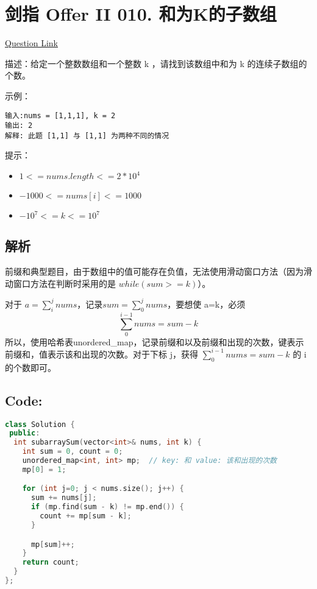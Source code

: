 ﻿\section{剑指 Offer II 010. 和为K的子数组}

\href{https://leetcode.cn/problems/QTMn0o/?envType=study-plan&id=lcof-ii&plan=lcof&plan_progress=yc5zsnt}{Question Link}

描述：给定一个整数数组和一个整数 k ，请找到该数组中和为 k 的连续子数组的个数。

示例：

\begin{lstlisting}
输入:nums = [1,1,1], k = 2
输出: 2
解释: 此题 [1,1] 与 [1,1] 为两种不同的情况
\end{lstlisting}

提示：

\begin{itemize}
  \item $1 <= nums.length <= 2 * 10^4$
  \item $-1000 <= nums[i] <= 1000$
  \item $-10^7 <= k <= 10^7$
\end{itemize}


\subsection{解析}

前缀和典型题目，由于数组中的值可能存在负值，无法使用滑动窗口方法（因为滑动窗口方法在判断时采用的是 $while(sum>=k)$）。

对于 $a=\sum_{i}^{j} nums$，记录$sum=\sum_{0}^{j}nums$，要想使 a=k，必须
 $$\sum_{0}^{i-1}nums=sum-k$$
所以，使用哈希表unordered\_map，记录前缀和以及前缀和出现的次数，键表示前缀和，值表示该和出现的次数。对于下标 j，获得 $\sum_{0}^{i-1}nums=sum-k$ 的 i 的个数即可。

\subsection*{Code:}

\begin{lstlisting}[language=C++]
class Solution {
 public:
  int subarraySum(vector<int>& nums, int k) {
    int sum = 0, count = 0;
    unordered_map<int, int> mp;  // key: 和 value: 该和出现的次数
    mp[0] = 1;

    for (int j=0; j < nums.size(); j++) {
      sum += nums[j];
      if (mp.find(sum - k) != mp.end()) {
        count += mp[sum - k];
      }

      mp[sum]++;
    }
    return count;
  }
};
\end{lstlisting}
